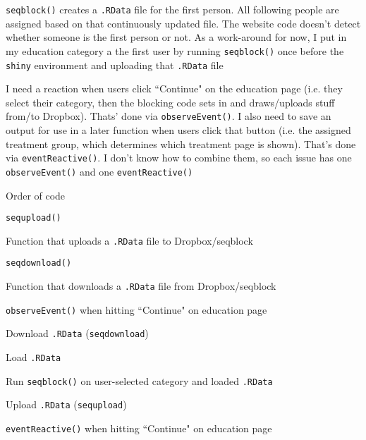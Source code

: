 \documentclass[12pt]{article}
\begin{document}
\begin{coi}
\begin{coi}
				\item \texttt{seqblock()} creates a \texttt{.RData} file for the first person. All following people are assigned based on that continuously updated file. The website code doesn't detect whether someone is the first person or not. As a work-around for now, I put in my education category a the first user by running \texttt{seqblock()} once before the \texttt{shiny} environment and uploading that \texttt{.RData} file
				\item I need a reaction when users click ``Continue" on the education page (i.e. they select their category, then the blocking code sets in and draws/uploads stuff from/to Dropbox). Thats' done via \texttt{observeEvent()}. I also need to save an output for use in a later function when users click that button (i.e. the assigned treatment group, which determines which treatment page is shown). That's done via \texttt{eventReactive()}. I don't know how to combine them, so each issue has one \texttt{observeEvent()} and one \texttt{eventReactive()}
				\item Order of code
					\begin{coi}
						\item \texttt{sequpload()}
							\begin{coi}
								\item Function that uploads a \texttt{.RData} file to Dropbox/seqblock
							\end{coi}
						\item \texttt{seqdownload()}
							\begin{coi}
								\item Function that downloads a \texttt{.RData} file from Dropbox/seqblock
							\end{coi}
						\item \texttt{observeEvent()} when hitting ``Continue" on education page
							\begin{coi}
								\item Download \texttt{.RData} (\texttt{seqdownload})
								\item Load \texttt{.RData}
								\item Run \texttt{seqblock()} on user-selected category and loaded \texttt{.RData}
								\item Upload \texttt{.RData} (\texttt{sequpload})
							\end{coi}
						\item \texttt{eventReactive()} when hitting ``Continue" on education page
							\begin{coi}

\end{coi}
\end{coi}
\end{coi}
\end{coi}
\end{document}

